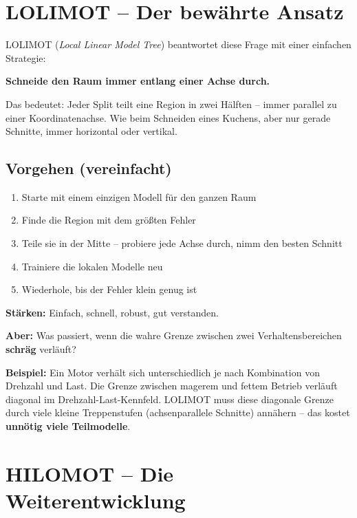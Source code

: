 \documentclass[12pt,a4paper]{article}
\begin{document}
\section{LOLIMOT -- Der bewährte Ansatz}

LOLIMOT (\textit{Local Linear Model Tree}) beantwortet diese Frage mit einer einfachen Strategie:

\textbf{Schneide den Raum immer entlang einer Achse durch.}

Das bedeutet: Jeder Split teilt eine Region in zwei Hälften -- immer parallel zu einer Koordinatenachse. Wie beim Schneiden eines Kuchens, aber nur gerade Schnitte, immer horizontal oder vertikal.

\subsection{Vorgehen (vereinfacht)}
\begin{enumerate}
  \item Starte mit einem einzigen Modell für den ganzen Raum
  \item Finde die Region mit dem größten Fehler
  \item Teile sie in der Mitte -- probiere jede Achse durch, nimm den besten Schnitt
  \item Trainiere die lokalen Modelle neu
  \item Wiederhole, bis der Fehler klein genug ist
\end{enumerate}

\textbf{Stärken:} Einfach, schnell, robust, gut verstanden.

\textbf{Aber:} Was passiert, wenn die \glqq wahre\grqq{} Grenze zwischen zwei Verhaltensbereichen \textbf{schräg} verläuft?

\begin{mdframed}
\textbf{Beispiel:} Ein Motor verhält sich unterschiedlich je nach Kombination von Drehzahl und Last. Die Grenze zwischen \glqq magerem\grqq{} und \glqq fettem\grqq{} Betrieb verläuft diagonal im Drehzahl-Last-Kennfeld. LOLIMOT muss diese diagonale Grenze durch viele kleine Treppenstufen (achsenparallele Schnitte) annähern -- das kostet \textbf{unnötig viele Teilmodelle}.
\end{mdframed}

\section{HILOMOT -- Die Weiterentwicklung}
\end{document}
